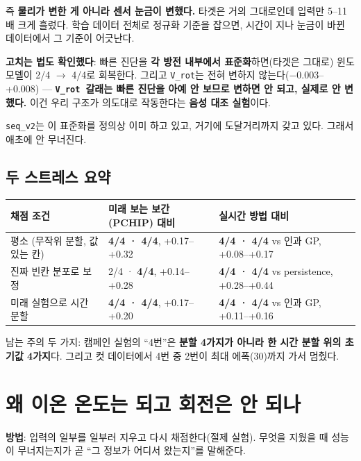 \documentclass[10pt]{article}
\newcommand{\Vrot}{\texttt{V\_rot}}
\newcommand{\seqv}{\texttt{seq\_v2}}
\begin{document}
즉 \textbf{물리가 변한 게 아니라 센서 눈금이 변했다.} 타겟은 거의 그대로인데 입력만
5--11배 크게 흘렀다. 학습 데이터 전체로 정규화 기준을 잡으면, 시간이 지나 눈금이 바뀐
데이터에서 그 기준이 어긋난다.

\textbf{고치는 법도 확인했다}: 빠른 진단을 \textbf{각 방전 내부에서 표준화}하면(타겟은
그대로) 윈도 모델이 2/4 $\rightarrow$ 4/4로 회복한다. 그리고 \Vrot 는 전혀 변하지
않는다($-$0.003--+0.008) --- \textbf{\Vrot\ 갈래는 빠른 진단을 아예 안 보므로 변하면 안
되고, 실제로 안 변했다.} 이건 우리 구조가 의도대로 작동한다는 \textbf{음성 대조 실험}이다.

\seqv 는 이 표준화를 정의상 이미 하고 있고, 거기에 도달거리까지 갖고 있다. 그래서 애초에
안 무너진다.

\subsection{두 스트레스 요약}

\begin{center}
\begin{tabularx}{\textwidth}{@{}L L L@{}}
\toprule
\textbf{채점 조건} & \textbf{미래 보는 보간(PCHIP) 대비} & \textbf{실시간 방법 대비} \\
\midrule
평소 (무작위 분할, 값 있는 칸) & \textbf{4/4 · 4/4}, +0.17--+0.32 &
  \textbf{4/4 · 4/4} vs 인과 GP, +0.08--+0.17 \\
진짜 빈칸 분포로 보정 & 2/4 · \textbf{4/4}, +0.14--+0.28 &
  \textbf{4/4 · 4/4} vs persistence, +0.28--+0.44 \\
미래 실험으로 시간 분할 & \textbf{4/4 · 4/4}, +0.17--+0.20 &
  \textbf{4/4 · 4/4} vs 인과 GP, +0.11--+0.16 \\
\bottomrule
\end{tabularx}
\end{center}

남는 주의 두 가지: 캠페인 실험의 ``4번''은 \textbf{분할 4가지가 아니라 한 시간 분할 위의
초기값 4가지}다. 그리고 컷 데이터에서 4번 중 2번이 최대 에폭(30)까지 가서 멈췄다.

\section{왜 이온 온도는 되고 회전은 안 되나}
\label{sec:asym}

\textbf{방법}: 입력의 일부를 일부러 지우고 다시 채점한다(절제 실험). 무엇을 지웠을 때
성능이 무너지는지가 곧 ``그 정보가 어디서 왔는지''를 말해준다.
\end{document}
